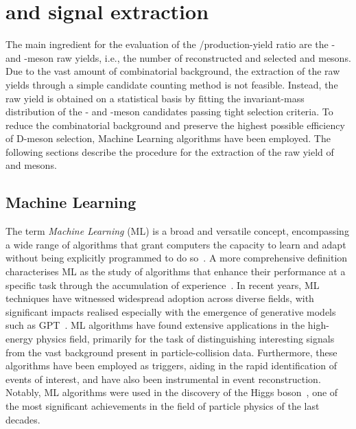 \chapter{\texorpdfstring{\ds and \dpl signal extraction}{Ds+ and D+ signal extraction}}\label{chap:RY}

The main ingredient for the evaluation of the \ds/\dpl production-yield ratio are the \ds- and \dpl-meson raw yields, i.e., the number of reconstructed and selected \ds and \dpl mesons. Due to the vast amount of combinatorial background, the extraction of the raw yields through a simple candidate counting method is not feasible. Instead, the raw yield is obtained on a statistical basis by fitting the invariant-mass distribution of the \ds- and \dpl-meson candidates passing tight selection criteria. To reduce the combinatorial background and preserve the highest possible efficiency of D-meson selection, Machine Learning algorithms have been employed. The following sections describe the procedure for the extraction of the raw yield of \ds and \dpl mesons. 


\section{Machine Learning}
The term \emph{Machine Learning} (ML) is a broad and versatile concept, encompassing a wide range of algorithms that grant computers the capacity to learn and adapt without being explicitly programmed to do so~\cite{5392560}. A more comprehensive definition characterises ML as the study of algorithms that enhance their performance at a specific task through the accumulation of experience~\cite{mitchell1997machine}. In recent years, ML techniques have witnessed widespread adoption across diverse fields, with significant impacts realised especially with the emergence of generative models such as GPT~\cite{openai2023gpt4}. ML algorithms have found extensive applications in the high-energy physics field, primarily for the task of distinguishing interesting signals from the vast background present in particle-collision data. Furthermore, these algorithms have been employed as triggers, aiding in the rapid identification of events of interest, and have also been instrumental in event reconstruction. Notably, ML algorithms were used in the discovery of the Higgs boson~\cite{CMS:2012qbp}, one of the most significant achievements in the field of particle physics of the last decades.



